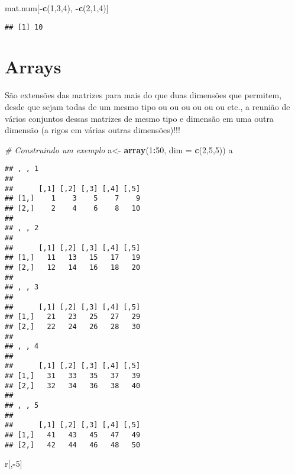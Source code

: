 \documentclass[]{article}
\newenvironment{Shaded}{\begin{snugshade}}{\end{snugshade}}
\newcommand{\KeywordTok}[1]{\textcolor[rgb]{0.13,0.29,0.53}{\textbf{#1}}}
\newcommand{\DataTypeTok}[1]{\textcolor[rgb]{0.13,0.29,0.53}{#1}}
\newcommand{\DecValTok}[1]{\textcolor[rgb]{0.00,0.00,0.81}{#1}}
\newcommand{\StringTok}[1]{\textcolor[rgb]{0.31,0.60,0.02}{#1}}
\newcommand{\CommentTok}[1]{\textcolor[rgb]{0.56,0.35,0.01}{\textit{#1}}}
\newcommand{\OperatorTok}[1]{\textcolor[rgb]{0.81,0.36,0.00}{\textbf{#1}}}
\newcommand{\NormalTok}[1]{#1}
\begin{document}
\begin{Shaded}
\begin{Highlighting}[]
\NormalTok{mat.num[}\OperatorTok{-}\KeywordTok{c}\NormalTok{(}\DecValTok{1}\NormalTok{,}\DecValTok{3}\NormalTok{,}\DecValTok{4}\NormalTok{), }\OperatorTok{-}\KeywordTok{c}\NormalTok{(}\DecValTok{2}\NormalTok{,}\DecValTok{1}\NormalTok{,}\DecValTok{4}\NormalTok{)]}
\end{Highlighting}
\end{Shaded}

\begin{verbatim}
## [1] 10
\end{verbatim}

\section{Arrays}\label{arrays}

São extensões das matrizes para mais do que duas dimensões que permitem,
desde que sejam todas de um mesmo tipo ou ou ou ou ou ou etc., a reunião
de vários conjuntos dessas matrizes de mesmo tipo e dimensão em uma
outra dimensão (a rigos em várias outras dimensões)!!!

\begin{Shaded}
\begin{Highlighting}[]
\CommentTok{# Construindo um exemplo}
\NormalTok{a<-}\StringTok{ }\KeywordTok{array}\NormalTok{(}\DecValTok{1}\OperatorTok{:}\DecValTok{50}\NormalTok{, }\DataTypeTok{dim =} \KeywordTok{c}\NormalTok{(}\DecValTok{2}\NormalTok{,}\DecValTok{5}\NormalTok{,}\DecValTok{5}\NormalTok{))}
\NormalTok{a}
\end{Highlighting}
\end{Shaded}

\begin{verbatim}
## , , 1
## 
##      [,1] [,2] [,3] [,4] [,5]
## [1,]    1    3    5    7    9
## [2,]    2    4    6    8   10
## 
## , , 2
## 
##      [,1] [,2] [,3] [,4] [,5]
## [1,]   11   13   15   17   19
## [2,]   12   14   16   18   20
## 
## , , 3
## 
##      [,1] [,2] [,3] [,4] [,5]
## [1,]   21   23   25   27   29
## [2,]   22   24   26   28   30
## 
## , , 4
## 
##      [,1] [,2] [,3] [,4] [,5]
## [1,]   31   33   35   37   39
## [2,]   32   34   36   38   40
## 
## , , 5
## 
##      [,1] [,2] [,3] [,4] [,5]
## [1,]   41   43   45   47   49
## [2,]   42   44   46   48   50
\end{verbatim}

\begin{Shaded}
\begin{Highlighting}[]
\NormalTok{r[,}\OperatorTok{-}\DecValTok{5}\NormalTok{]}
\end{Highlighting}
\end{Shaded}
\end{document}
